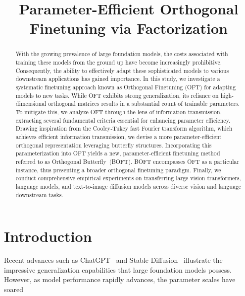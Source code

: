 \title{Parameter-Efficient Orthogonal Finetuning via Factorization}

\begin{abstract}
With the growing prevalence of large foundation models, the costs associated with training these models from the ground up have become increasingly prohibitive. Consequently, the ability to effectively adapt these sophisticated models to various downstream applications has gained importance. In this study, we investigate a systematic finetuning approach known as Orthogonal Finetuning (OFT) for adapting models to new tasks. While OFT exhibits strong generalization, its reliance on high-dimensional orthogonal matrices results in a substantial count of trainable parameters. To mitigate this, we analyze OFT through the lens of information transmission, extracting several fundamental criteria essential for enhancing parameter efficiency. Drawing inspiration from the Cooley-Tukey fast Fourier transform algorithm, which achieves efficient information transmission, we devise a more parameter-efficient orthogonal representation leveraging butterfly structures. Incorporating this parameterization into OFT yields a new, parameter-efficient finetuning method referred to as Orthogonal Butterfly~(BOFT). BOFT encompasses OFT as a particular instance, thus presenting a broader orthogonal finetuning paradigm. Finally, we conduct comprehensive empirical experiments on transferring large vision transformers, language models, and text-to-image diffusion models across diverse vision and language downstream tasks.
\end{abstract}

\section{Introduction}

Recent advances such as ChatGPT~\cite{brown2020language,chen2021evaluating} and Stable Diffusion~\cite{rombach2022high} illustrate the impressive generalization capabilities that large foundation models possess. However, as model performance rapidly advances, the parameter scales have soared

